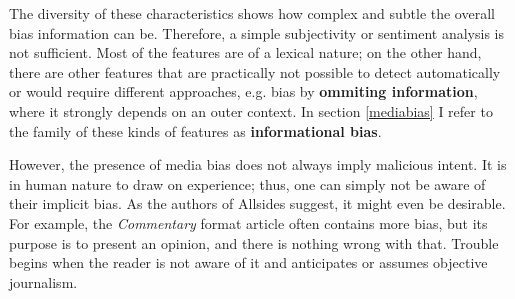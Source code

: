 The diversity of these characteristics shows how complex and subtle the overall bias information can be. Therefore, a simple subjectivity or sentiment analysis is not sufficient. Most of the features are of a lexical nature; on the other hand, there are other features that are practically not possible to detect automatically or would require different approaches, e.g. bias by \textbf{ommiting information}, where it strongly depends on an outer context. In section \ref{mediabias} I refer to the family of these kinds of features as \textbf{informational bias}.


However, the presence of media bias does not always imply malicious intent. It is in human nature to draw on experience; thus, one can simply not be aware of their implicit bias. As the authors of Allsides suggest, it might even be desirable. For example, the \textit{Commentary} format article often contains more bias, but its purpose is to present an opinion, and there is nothing wrong with that. Trouble begins when the reader is not aware of it and anticipates or assumes objective journalism.




